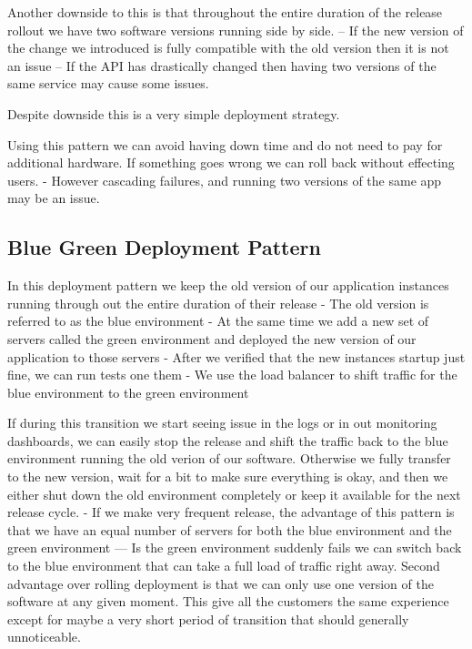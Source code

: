 \documentclass[a4paper, 11pt]{book}
\begin{document}
{    Another downside to this is that throughout the entire duration of the release rollout we have two software versions running side by side.
    -- If the new version of the change we introduced is fully compatible with the old version then it is not an issue
    -- If the API has drastically changed then having two versions of the same service may cause some issues.

    Despite downside this is a very simple deployment strategy.

    Using this pattern we can avoid having down time and do not need to pay for additional hardware.
    If something goes wrong we can roll back without effecting users.
    - However cascading failures, and running two versions of the same app may be an issue.

    \subsection{Blue Green Deployment Pattern}
    In this deployment pattern we keep the old version of our application instances running through out the entire duration of their release
    - The old version is referred to as the blue environment
    - At the same time we add a new set of servers called the green environment and deployed the new version of our application to those servers
    - After we verified that the new instances startup just fine, we can run tests one them
    - We use the load balancer to shift traffic for the blue environment to the green environment

    If during this transition we start seeing issue in the logs or in out monitoring dashboards, we can easily stop the release and shift the traffic back to the blue environment running the old verion of our software.
    Otherwise we fully transfer to the new version, wait for a bit to make sure everything is okay, and then we either shut down the old environment completely or keep it available for the next release cycle.
    - If we make very frequent release, the advantage of this pattern is that we have an equal number of servers for both the blue environment and the green environment
    --- Is the green environment suddenly fails we can switch back to the blue environment that can take a full load of traffic right away.
    Second advantage over rolling deployment is that we can only use one version of the software at any given moment.
    This give all the customers the same experience except for maybe a very short period of transition that should generally unnoticeable.

}
\end{document}
